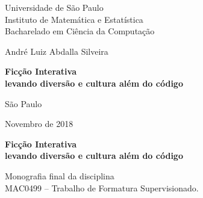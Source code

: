 \documentclass[12pt,twoside,a4paper,openany]{book}
\begin{document}
    \frontmatter
    \fancyhead[RO]{{\footnotesize\rightmark}\hspace{2em}\thepage}
    \setcounter{tocdepth}{2}
    \fancyhead[LE]{\thepage\hspace{2em}\footnotesize{\leftmark}}
    \fancyhead[RE,LO]{}
    \fancyhead[RO]{{\footnotesize\rightmark}\hspace{2em}\thepage}

    \onehalfspacing  %


    \thispagestyle{empty}
    \begin{center}
        \vspace*{2.3cm}
        Universidade de São Paulo\\
        Instituto de Matemática e Estatística \\
        Bacharelado  em Ciência da Computação


        \vspace*{3cm}
        \Large{André Luiz Abdalla Silveira}


        \vspace{3cm}
        \textbf{\Large{Ficção Interativa \\
            levando diversão e cultura além do código}}


        \vskip 5cm
        \normalsize{São Paulo}

        \normalsize{Novembro de 2018}
    \end{center}
    \newpage
    \thispagestyle{empty}
    \begin{center}
        \vspace*{2.3 cm}
        \textbf{\Large{Ficção Interativa \\
            levando diversão e cultura além do código}}
        \vspace*{2 cm}
    \end{center}

    \vskip 2cm

    \begin{flushright}
        Monografia final da disciplina \\
        MAC0499 -- Trabalho de Formatura Supervisionado.
    \end{flushright}

    \vskip 5cm
\end{document}
